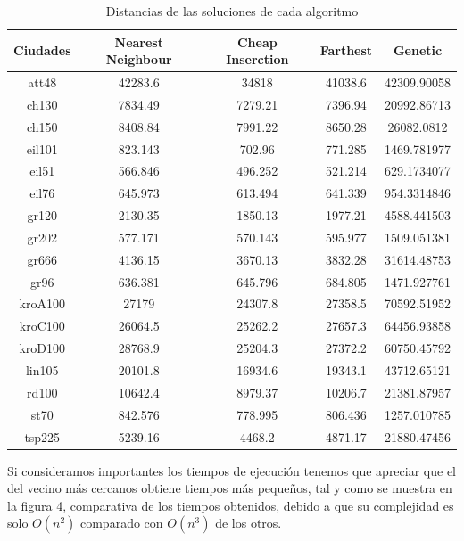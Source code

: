 \documentclass{article}
\begin{document}
\begin{table}[h]
  \centering
  \begin{tabular}{|c|c|c|c|c|}
    \hline
    Ciudades & Nearest Neighbour & Cheap Inserction & Farthest & Genetic \\ \hline 
    att48 & 42283.6 & 34818 & 41038.6 & 42309.90058 \\
    ch130 & 7834.49 & 7279.21 & 7396.94 & 20992.86713 \\
    ch150 & 8408.84 & 7991.22 & 8650.28 & 26082.0812 \\
    eil101 & 823.143 & 702.96 & 771.285 & 1469.781977 \\
    eil51 & 566.846 & 496.252 & 521.214 & 629.1734077 \\
    eil76 & 645.973 & 613.494 & 641.339 & 954.3314846 \\
    gr120 & 2130.35 & 1850.13 & 1977.21 & 4588.441503 \\
    gr202 & 577.171 & 570.143 & 595.977 & 1509.051381 \\
    gr666 & 4136.15 & 3670.13 & 3832.28 & 31614.48753 \\
    gr96 & 636.381 & 645.796 & 684.805 & 1471.927761 \\
    kroA100 & 27179 & 24307.8 & 27358.5 & 70592.51952 \\
    kroC100 & 26064.5 & 25262.2 & 27657.3 & 64456.93858 \\
    kroD100 & 28768.9 & 25204.3 & 27372.2 & 60750.45792 \\
    lin105 & 20101.8 & 16934.6 & 19343.1 & 43712.65121 \\
    rd100 & 10642.4 & 8979.37 & 10206.7 & 21381.87957 \\
    st70 & 842.576 & 778.995 & 806.436 & 1257.010785 \\
    tsp225 & 5239.16 & 4468.2 & 4871.17 & 21880.47456 \\ \hline
  \end{tabular}
  \caption{Distancias de las soluciones de cada algoritmo}
\end{table}

Si consideramos importantes los tiempos de ejecución tenemos que
apreciar que el del vecino más cercanos obtiene tiempos más pequeños, tal 
y como se muestra en la figura 4, comparativa de los tiempos obtenidos,
debido a que su complejidad es solo $O(n^2)$ comparado con $O(n^3)$ de
los otros.
\end{document}
